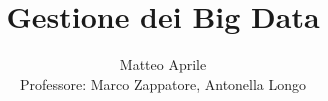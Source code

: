 \documentclass[journal]{IEEEtran}
\begin{document}
\title{Gestione dei Big Data}



\author{Matteo Aprile\\
				Professore: Marco Zappatore, Antonella Longo\\
        }
        
\maketitle

\tableofcontents
\underline{\hspace{ 80 mm }}










\end{document}
